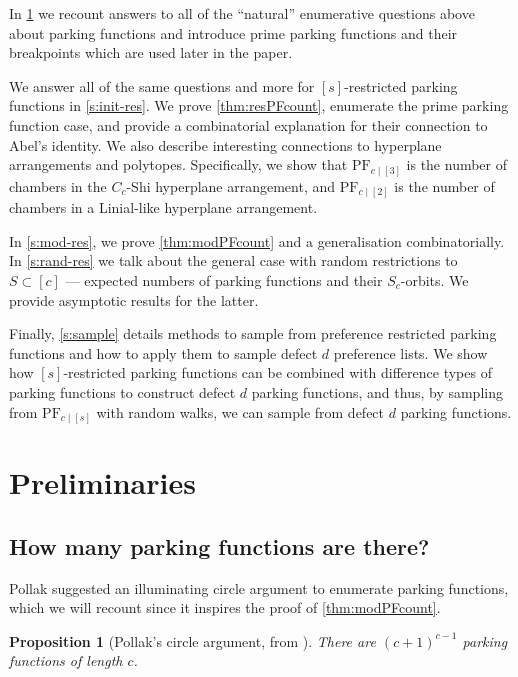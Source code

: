 \documentclass[12 pt]{amsart}
\newtheorem{proposition}[theorem]{Proposition}
\theoremstyle{definition} %
\theoremstyle{remark} %
\begin{document}
In \cref{s:prelim} we recount answers to all of the ``natural'' enumerative questions above about parking functions and introduce prime parking functions and their breakpoints which are used later in the paper.

We answer all of the same questions and more for $[s]$-restricted parking functions in \cref{s:init-res}. We prove \cref{thm:resPFcount}, enumerate the prime parking function case, and provide a combinatorial explanation for their connection to Abel's identity. We also describe interesting connections to hyperplane arrangements and polytopes. Specifically, we show that $\mathrm{PF}_{c \mid [3]}$ is the number of chambers in the $C_{c}$-Shi hyperplane arrangement, and $\mathrm{PF}_{c \mid [2]}$ is the number of chambers in a Linial-like hyperplane arrangement. 

In \cref{s:mod-res}, we prove \cref{thm:modPFcount} and a generalisation combinatorially. In \cref{s:rand-res} we talk about the general case with random restrictions to $S \subset [c]$ --- expected numbers of parking functions and their $S_{c}$-orbits. We provide asymptotic results for the latter.

Finally, \cref{s:sample} details methods to sample from preference restricted parking functions and how to apply them to sample defect $d$ preference lists. We show how $[s]$-restricted parking functions can be combined with difference types of parking functions to construct defect $d$ parking functions, and thus, by sampling from $\mathrm{PF}_{c \mid [s]}$ with random walks, we can sample from defect $d$ parking functions.
       
\section{Preliminaries} \label{s:prelim}

\subsection{How many parking functions are there?}

Pollak suggested an illuminating circle argument to enumerate parking functions, which we will recount since it inspires the proof of \cref{thm:modPFcount}.

\begin{proposition}[Pollak's circle argument, from \cite{riordan-1969}]
	There are $(c + 1)^{c - 1}$ parking functions of length $c$.
\end{proposition}
\end{document}
